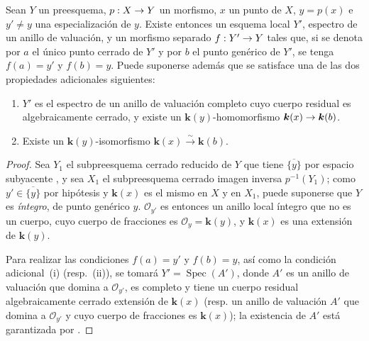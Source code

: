 \documentclass[oneside,10pt]{amsart}
\makeatletter
\newcommand{\ega@arrow}[2]{\mathchoice{#1}{#2}{#2}{#2}}
\renewcommand{\to}{\ega@arrow{\longrightarrow}{\rightarrow}}
\let\EGAOriginalLabel\label
\renewcommand{\label}[1]{\phantomsection\EGAOriginalLabel{#1}}
\makeatother
\begin{document}
\begin{proposition}[7.1.4]
\label{II.7.1.4-fr}
Sean $Y$ un preesquema, $p:X\to Y$ un morfismo, $x$ un punto de $X$, $y=p(x)$ e $y'\neq y$ una especialización  de $y$.
Existe entonces un esquema local $Y'$, espectro de un anillo de valuación, y un morfismo separado $f:Y'\to Y$ tales que, si se denota por $a$ el único punto cerrado de $Y'$ y por $b$ el punto genérico de $Y'$, se tenga
$f(a)=y'$ y $f(b)=y$.
Puede suponerse además que se satisface una de las dos propiedades adicionales siguientes:
\begin{enumerate}
  \item[\rm{(i)}] $Y'$ es el espectro de un anillo de valuación completo cuyo cuerpo residual es algebraicamente cerrado, y existe un $\boldsymbol{k}(y)$-homomorfismo $\boldsymbol{k}(x)\to \boldsymbol{k}(b)$.
  \item[\rm{(ii)}] Existe un $\boldsymbol{k}(y)$-isomorfismo $\boldsymbol{k}(x)\xrightarrow{\sim}\boldsymbol{k}(b)$.
\end{enumerate}
\end{proposition}

\begin{proof}
Sea $Y_1$ el subpreesquema cerrado reducido de $Y$ que tiene $\overline{\{y\}}$ por espacio subyacente , y sea $X_1$ el subpreesquema cerrado imagen inversa $p^{-1}(Y_1)$;
como $y'\in\overline{\{y\}}$ por hipótesis y $\boldsymbol{k}(x)$ es el mismo en $X$ y en $X_1$, puede suponerse que $Y$ es \emph{íntegro}, de punto genérico $y$.
$\mathcal{O}_{y'}$ es entonces un anillo local íntegro que no es un cuerpo, cuyo cuerpo de fracciones es $\mathcal{O}_y=\boldsymbol{k}(y)$, y $\boldsymbol{k}(x)$ es una extensión de $\boldsymbol{k}(y)$.

Para realizar las condiciones $f(a)=y'$ y $f(b)=y$, así como la condición adicional~(i) (resp.~(ii)), se tomará $Y'=\operatorname{Spec}(A')$, donde $A'$ es un anillo de valuación que domina a $\mathcal{O}_{y'}$, es completo y tiene un cuerpo residual algebraicamente cerrado extensión de $\boldsymbol{k}(x)$ (resp. un anillo de valuación $A'$ que domina a $\mathcal{O}_{y'}$ y cuyo cuerpo de fracciones es $\boldsymbol{k}(x)$);
la existencia de $A'$ está garantizada por .
\end{proof}
\end{document}
